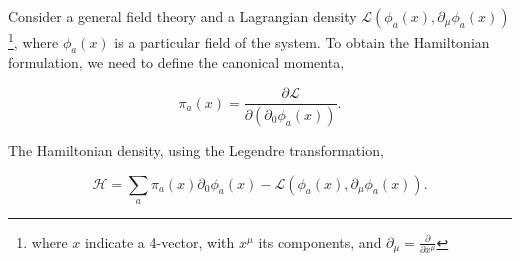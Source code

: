 \documentclass[11pt,a4paper,twoside,pdf]{article}
\numberwithin{equation}{section}
\begin{document}

Consider a general field theory and a Lagrangian density 
$\mathcal{L}(\phi_a (x),\partial_\mu\phi_a (x))$\footnote{where $x$ indicate a 
4-vector, with $x^\mu$ its components, and $\partial_\mu = \frac{\partial}
{\partial x^\mu}$}, where $\phi_a (x)$ is a particular field of the system.
To obtain the Hamiltonian formulation, we need to define the 
canonical momenta,

\begin{equation}
    \pi_a (x) = \frac{\partial \mathcal{L}}{\partial (\partial_0 \phi_a (x))}.
\end{equation}

The Hamiltonian density, using the Legendre transformation,

\begin{equation}
    \mathcal{H} = \sum_a \pi_a (x) \partial_0 \phi_a (x) - 
    \mathcal{L}(\phi_a (x),\partial_\mu\phi_a (x)).
\end{equation}
\end{document}
